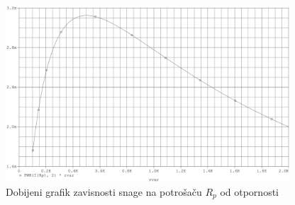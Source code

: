 \documentclass{article}
\begin{document}
    \begin{figure}[H]
        \centering
        \includegraphics[width=400px]{Grafik.png}
        \caption{Dobijeni grafik zavisnosti snage na potrošaču $R_p$ od otpornosti}
        \label{Grafik}
    \end{figure}
\end{document}
